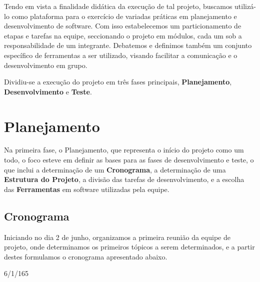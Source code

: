\documentclass[10pt,a4paper]{report}
\begin{document}
Tendo em vista a finalidade didática da execução de tal projeto, buscamos utilizá-lo como plataforma para o exercício de variadas práticas em planejamento e desenvolvimento de software. Com isso estabelecemos um particionamento de etapas e tarefas na equipe, seccionando o projeto em módulos, cada um sob a responsabilidade de um integrante. Debatemos e definimos também um conjunto específico de ferramentas a ser utilizado, visando facilitar a comunicação e o desenvolvimento em grupo.

Dividiu-se a execução do projeto em três fases principais, \textbf{Planejamento}, \textbf{Desenvolvimento} e \textbf{Teste}.

\chapter{Planejamento}
Na primeira fase, o Planejamento, que representa o início do projeto como um todo, o foco esteve em definir as bases para as fases de desenvolvimento e teste, o que inclui a determinação de um \textbf{Cronograma}, a determinação de uma \textbf{Estrutura do Projeto}, a divisão das tarefas de desenvolvimento, e a escolha das \textbf{Ferramentas} em software utilizadas pela equipe.
\section{Cronograma}
Iniciando no dia 2 de junho, organizamos a primeira reunião da equipe de projeto, onde determinamos os primeiros tópicos a serem determinados, e a partir destes formulamos o cronograma apresentado abaixo.
\begin{calendar}{6/1/16}{5}
\setlength{\calboxdepth}{.3in}

\skipday\skipday
{}

\end{calendar}
\end{document}
